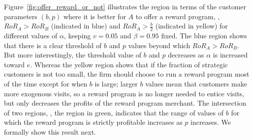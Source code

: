 Figure~\ref{fig:offer_reward_or_not} illustrates the region in terms of the customer parameters $(b,p)$ where it is better for $A$ to offer a reward program, \ie, $RoR_A > RoR_B$ (indicated in blue) and $RoR_A > \frac{b}{2}$ (indicated in yellow) for different values of $\alpha$, keeping $v = 0.05$ and $\beta = 0.95$ fixed.
The blue region shows that there is a clear threshold of $b$ and $p$ values beyond which $RoR_A > RoR_B$.
But more interestingly, the threshold value of $b$ and $p$ decreases as $\alpha$ is increased toward $e$.
Whereas the yellow region shows that if the fraction of strategic customers is not too small, the firm should choose to run a reward program most of the time except for when $b$ is large; larger $b$ values mean that customers make more exogenous visits, so a reward program is no longer needed to entice visits, but only decreases the profits of the reward program merchant.
The intersection of two regions, \ie, the region in green, indicates that the range of values of $b$ for which the reward program is strictly profitable increases as $p$ increases.
We formally show this result next.

